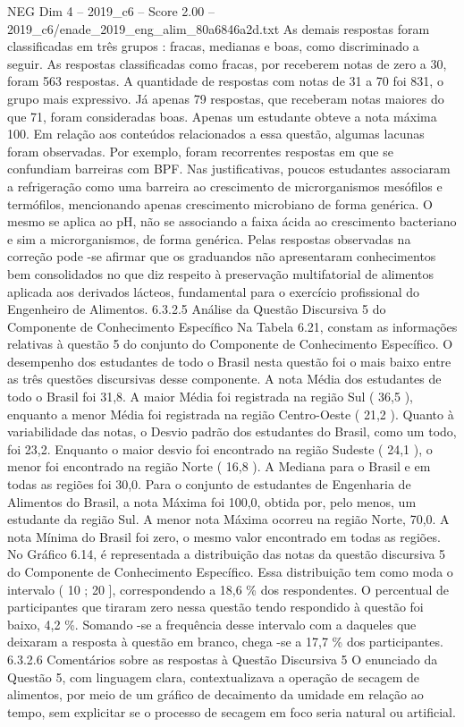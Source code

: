 \begin{textsample}{NEG Dim 4 – 2019\_c6 – Score 2.00 – 2019\_c6/enade\_2019\_eng\_alim\_80a6846a2d.txt}
As demais respostas foram classificadas em três grupos : fracas, medianas e boas, como discriminado a seguir.
As respostas classificadas como fracas, por receberem notas de zero a 30, foram 563 respostas.
A quantidade de respostas com notas de 31 a 70 foi 831, o grupo mais expressivo.
Já apenas 79 respostas, que receberam notas maiores do que 71, foram consideradas boas.
Apenas um estudante obteve a nota máxima 100.
Em relação aos conteúdos relacionados a essa questão, algumas lacunas foram observadas.
Por exemplo, foram recorrentes respostas em que se confundiam barreiras com BPF.
Nas justificativas, poucos estudantes associaram a refrigeração como uma barreira ao crescimento de microrganismos mesófilos e termófilos, mencionando apenas crescimento microbiano de forma genérica.
O mesmo se aplica ao pH, não se associando a faixa ácida ao crescimento bacteriano e sim a microrganismos, de forma genérica.
Pelas respostas observadas na correção pode -se afirmar que os graduandos não apresentaram conhecimentos bem consolidados no que diz respeito à preservação multifatorial de alimentos aplicada aos derivados lácteos, fundamental para o exercício profissional do Engenheiro de Alimentos. 6.3.2.5 Análise da Questão Discursiva 5 do Componente de Conhecimento Específico Na Tabela 6.21, constam as informações relativas à questão 5 do conjunto do Componente de Conhecimento Específico.
O desempenho dos estudantes de todo o Brasil nesta questão foi o mais baixo entre as três questões discursivas desse componente.
A nota Média dos estudantes de todo o Brasil foi 31,8.
A maior Média foi registrada na região Sul ( 36,5 ), enquanto a menor Média foi registrada na região Centro-Oeste ( 21,2 ).
Quanto à variabilidade das notas, o Desvio padrão dos estudantes do Brasil, como um todo, foi 23,2.
Enquanto o maior desvio foi encontrado na região Sudeste ( 24,1 ), o menor foi encontrado na região Norte ( 16,8 ).
A Mediana para o Brasil e em todas as regiões foi 30,0.
Para o conjunto de estudantes de Engenharia de Alimentos do Brasil, a nota Máxima foi 100,0, obtida por, pelo menos, um estudante da região Sul.
A menor nota Máxima ocorreu na região Norte, 70,0.
A nota Mínima do Brasil foi zero, o mesmo valor encontrado em todas as regiões.
No Gráfico 6.14, é representada a distribuição das notas da questão discursiva 5 do Componente de Conhecimento Específico.
Essa distribuição tem como moda o intervalo ( 10 ; 20 ], correspondendo a 18,6 \% dos respondentes.
O percentual de participantes que tiraram zero nessa questão tendo respondido à questão foi baixo, 4,2 \%.
Somando -se a frequência desse intervalo com a daqueles que deixaram a resposta à questão em branco, chega -se a 17,7 \% dos participantes. 6.3.2.6 Comentários sobre as respostas à Questão Discursiva 5 O enunciado da Questão 5, com linguagem clara, contextualizava a operação de secagem de alimentos, por meio de um gráfico de decaimento da umidade em relação ao tempo, sem explicitar se o processo de secagem em foco seria natural ou artificial.

\end{textsample}
